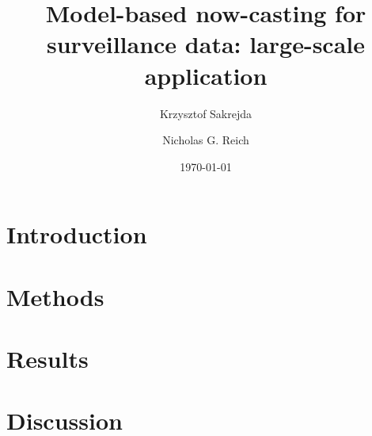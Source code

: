 \documentclass[letterpaper,11pt,oneside,article]{memoir}
\title{Model-based now-casting for surveillance data: large-scale
application}
\author[$^\star$]{Krzysztof Sakrejda}
\author[$^\star$]{Nicholas G. Reich}
\affil[$^\star$]{University of Massachusetts - Amherst}
\date{\today}  %
\begin{document}
\maketitle %

\clearpage

\linenumbers

\chapter{Introduction}


\chapter{Methods}


\chapter{Results}


\chapter{Discussion}


\clearpage


\newpage
\appendix





%
%
\printbibliography 
\end{document}
